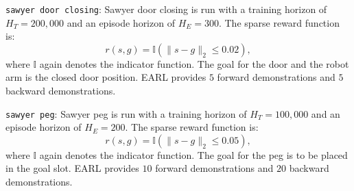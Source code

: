 \documentclass[nohyperref]{article}
\theoremstyle{plain}
\theoremstyle{definition}
\theoremstyle{remark}
\begin{document}
\texttt{sawyer door closing}:
Sawyer door closing is run with a training horizon of $H_T = 200,000$ and an episode horizon of $H_E = 300$. The sparse reward function is:
$$ r(s, g) = \mathbb{I}(\lVert s - g \rVert_2 \leq 0.02),$$
where $\mathbb{I}$ again denotes the indicator function. The goal for the door and the robot arm is the closed door position. EARL provides $5$ forward demonstrations and $5$ backward demonstrations.

\texttt{sawyer peg}:
Sawyer peg is run with a training horizon of $H_T = 100,000$ and an episode horizon of $H_E = 200$. The sparse reward function is: 
$$ r(s, g) = \mathbb{I}(\lVert s - g \rVert_2 \leq 0.05),$$
where $\mathbb{I}$ again denotes the indicator function. The goal for the peg is to be placed in the goal slot. EARL provides $10$ forward demonstrations and $20$ backward demonstrations.
\end{document}
